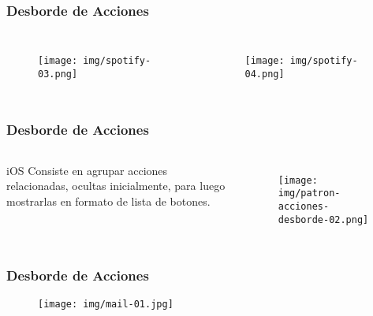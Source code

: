 \documentclass{beamer}
\begin{document}
\begin{frame}
\frametitle{Desborde de Acciones}

\begin{columns}[c] %

\begin{figure}[H]
  \centering
  \texttt{[image: img/spotify-03.png]}
\end{figure}

\begin{figure}[H]
  \centering
  \texttt{[image: img/spotify-04.png]}
\end{figure}

\end{columns}
\end{frame}


\begin{frame}
\frametitle{Desborde de Acciones}

\begin{columns}[c] %

\begin{block}{iOS}
\justify
Consiste en agrupar acciones relacionadas, ocultas inicialmente, para luego mostrarlas en formato de lista de botones.
\end{block}

\begin{figure}[H]
  \centering
  \texttt{[image: img/patron-acciones-desborde-02.png]}
\end{figure}
\end{columns}
\end{frame}


\begin{frame}
\frametitle{Desborde de Acciones}

\begin{figure}[H]
  \centering
  \texttt{[image: img/mail-01.jpg]}
\end{figure}
\end{frame}
\end{document}
